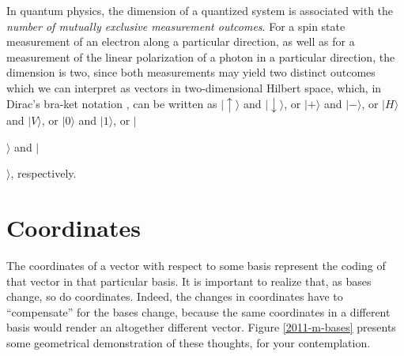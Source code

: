 {\color{Purple}
In quantum physics, the dimension of a quantized system is associated with
the {\em number of mutually exclusive measurement outcomes}.
For a spin state measurement of an electron
along a particular direction,
as well as for a measurement of the linear polarization
of a photon in a particular direction,
the dimension is two, since both measurements
may yield two distinct outcomes
which we can
interpret as vectors in two-dimensional Hilbert space,
which, in Dirac's bra-ket notation \cite{dirac}, can be written as
$
\mid \uparrow \rangle$ and $\mid \downarrow \rangle$,
or $\mid + \rangle$ and $
\mid - \rangle
$,
or
$
\mid H \rangle $ and $
\mid V \rangle
$,
or
$
\mid 0 \rangle $ and $
\mid 1 \rangle
$,
or
$
\mid$$\rangle $ and $
\mid$$\rangle
$,
respectively.
}

\section{Coordinates}
The coordinates of a vector with respect to some basis
represent the coding of that vector in that particular basis.
It is important to realize that, as bases change, so do coordinates.
Indeed, the changes in coordinates have to ``compensate'' for the bases change,
because the same coordinates in a different basis would render an altogether different
vector.
Figure \ref{2011-m-bases} presents some geometrical demonstration of
these thoughts, for your contemplation.

